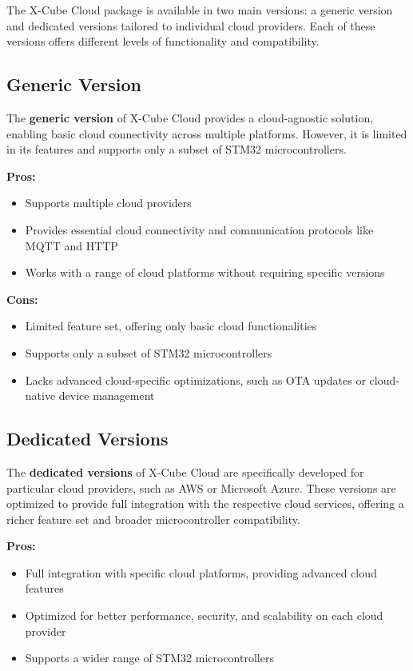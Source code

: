The X-Cube Cloud package is available in two main versions: a generic version and dedicated versions tailored to individual cloud providers. Each of these versions offers different levels of functionality and compatibility.

\subsection*{Generic Version}
The \textbf{generic version} of X-Cube Cloud provides a cloud-agnostic solution, enabling basic cloud connectivity across multiple platforms. However, it is limited in its features and supports only a subset of STM32 microcontrollers.

\textbf{Pros:}
\begin{itemize}
    \item Supports multiple cloud providers
    \item Provides essential cloud connectivity and communication protocols like MQTT and HTTP
    \item Works with a range of cloud platforms without requiring specific versions
\end{itemize}

\textbf{Cons:}
\begin{itemize}
    \item Limited feature set, offering only basic cloud functionalities
    \item Supports only a subset of STM32 microcontrollers
    \item Lacks advanced cloud-specific optimizations, such as OTA updates or cloud-native device management
\end{itemize}

\subsection*{Dedicated Versions}
The \textbf{dedicated versions} of X-Cube Cloud are specifically developed for particular cloud providers, such as AWS or Microsoft Azure. These versions are optimized to provide full integration with the respective cloud services, offering a richer feature set and broader microcontroller compatibility.

\textbf{Pros:}
\begin{itemize}
    \item Full integration with specific cloud platforms, providing advanced cloud features
    \item Optimized for better performance, security, and scalability on each cloud provider
    \item Supports a wider range of STM32 microcontrollers
\end{itemize}


